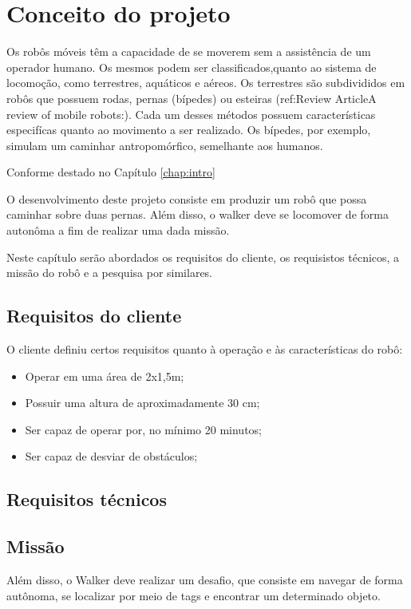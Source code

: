\chapter{Conceito do projeto}
\label{chap:fundteor}
Os robôs móveis têm a capacidade de se moverem sem a assistência de um operador humano. Os mesmos podem ser classificados,quanto ao sistema de locomoção, como terrestres, aquáticos e aéreos. Os terrestres são subdivididos em robôs que possuem rodas, pernas (bípedes) ou esteiras (ref:Review ArticleA review of mobile robots:). Cada um desses métodos possuem características especifícas quanto ao movimento a ser realizado. Os bípedes, por exemplo, simulam um caminhar antropomórfico, semelhante aos humanos.

Conforme destado no Capítulo \ref{chap:intro}

O desenvolvimento deste projeto consiste em produzir um robô que possa caminhar sobre duas pernas. Além disso, o walker deve se locomover de forma autonôma a fim de realizar uma dada missão.

Neste capítulo serão abordados os requisitos do cliente, os requisistos técnicos, a missão do robô e a pesquisa por similares. 



\section{Requisitos do cliente}
 O cliente definiu certos requisitos quanto à operação e  às características do robô:
 \begin{itemize}
    \item Operar em uma área de 2x1,5m;
    \item Possuir uma altura de aproximadamente 30 cm;
    \item Ser capaz de operar por, no mínimo 20 minutos;
    \item Ser capaz de desviar de obstáculos;
 \end{itemize}

 \section{Requisitos técnicos}


   \lipsum[2-4]

 \section{Missão}
 \lipsum
 Além disso, o Walker deve realizar um desafio, que consiste em navegar de forma autônoma, se localizar por meio de tags e encontrar um determinado objeto.


